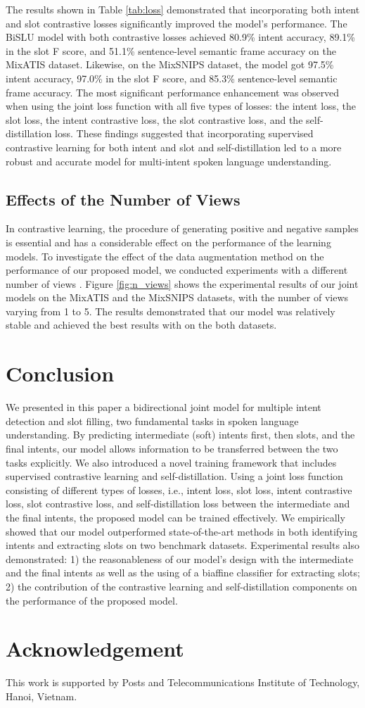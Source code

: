 \documentclass{ecai}
\begin{document}
The results shown in Table \ref{tab:loss} demonstrated that incorporating both intent and slot contrastive losses significantly improved the model's performance. The BiSLU model with both contrastive losses achieved 80.9\% intent accuracy, 89.1\% in the slot F score, and 51.1\% sentence-level semantic frame accuracy on the MixATIS dataset. Likewise, on the MixSNIPS dataset, the model got 97.5\% intent accuracy, 97.0\% in the slot F score, and 85.3\% sentence-level semantic frame accuracy. The most significant performance enhancement was observed when using the joint loss function with all five types of losses: the intent loss, the slot loss, the intent contrastive loss, the slot contrastive loss, and the self-distillation loss. These findings suggested that incorporating supervised contrastive learning for both intent and slot and self-distillation led to a more robust and accurate model for multi-intent spoken language understanding.

\subsection{Effects of the Number of Views}
In contrastive learning, the procedure of generating positive and negative samples is essential and has a considerable effect on the performance of the learning models. To investigate the effect of the data augmentation method on the performance of our proposed model, we conducted experiments with a different number of views . Figure \ref{fig:n_views} shows the experimental results of our joint models on the MixATIS and the MixSNIPS datasets, with the number of views varying from 1 to 5. The results demonstrated that our model was relatively stable and achieved the best results with  on the both datasets.    
\section{Conclusion}
We presented in this paper a bidirectional joint model for multiple intent detection and slot filling, two fundamental tasks in spoken language understanding. By predicting intermediate (soft) intents first, then slots, and the final intents, our model allows information to be transferred between the two tasks explicitly. We also introduced a novel training framework that includes supervised contrastive learning and self-distillation. Using a joint loss function consisting of different types of losses, i.e., intent loss, slot loss, intent contrastive loss, slot contrastive loss, and self-distillation loss between the intermediate and the final intents, the proposed model can be trained effectively. We empirically showed that our model outperformed state-of-the-art methods in both identifying intents and extracting slots on two benchmark datasets. Experimental results also demonstrated:  1) the reasonableness of our model’s design with the intermediate and the final intents as well as the using of a biaffine classifier for extracting slots; 2) the contribution of the contrastive learning and self-distillation components on the performance of the proposed model.   

\section*{Acknowledgement}
This work is supported by Posts and Telecommunications Institute of Technology, Hanoi, Vietnam.

\end{document}
